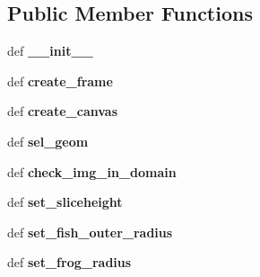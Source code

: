 \subsection*{Public Member Functions}
\begin{DoxyCompactItemize}
\item 
\hypertarget{classpyfrp__subwin_1_1geometry__dialog_a8d39e5a018a156eb1c1b6e3bfdfa5295}{def {\bfseries \+\_\+\+\_\+init\+\_\+\+\_\+}}\label{classpyfrp__subwin_1_1geometry__dialog_a8d39e5a018a156eb1c1b6e3bfdfa5295}

\item 
\hypertarget{classpyfrp__subwin_1_1geometry__dialog_a41cfb95e4241f7089dda03d9921329a9}{def {\bfseries create\+\_\+frame}}\label{classpyfrp__subwin_1_1geometry__dialog_a41cfb95e4241f7089dda03d9921329a9}

\item 
\hypertarget{classpyfrp__subwin_1_1geometry__dialog_a7d8fc02027fd8a693b1b96ee85cd4e53}{def {\bfseries create\+\_\+canvas}}\label{classpyfrp__subwin_1_1geometry__dialog_a7d8fc02027fd8a693b1b96ee85cd4e53}

\item 
\hypertarget{classpyfrp__subwin_1_1geometry__dialog_a25b8f2ca40a58fabf33653dd5ed667d5}{def {\bfseries sel\+\_\+geom}}\label{classpyfrp__subwin_1_1geometry__dialog_a25b8f2ca40a58fabf33653dd5ed667d5}

\item 
\hypertarget{classpyfrp__subwin_1_1geometry__dialog_a4313586cc51acb23523ca2a7493d5797}{def {\bfseries check\+\_\+img\+\_\+in\+\_\+domain}}\label{classpyfrp__subwin_1_1geometry__dialog_a4313586cc51acb23523ca2a7493d5797}

\item 
\hypertarget{classpyfrp__subwin_1_1geometry__dialog_a512d9462da92bae0f5b6246576ca5a5d}{def {\bfseries set\+\_\+sliceheight}}\label{classpyfrp__subwin_1_1geometry__dialog_a512d9462da92bae0f5b6246576ca5a5d}

\item 
\hypertarget{classpyfrp__subwin_1_1geometry__dialog_ab6a42708c12a1a1e21a1dab0e9c8616f}{def {\bfseries set\+\_\+fish\+\_\+outer\+\_\+radius}}\label{classpyfrp__subwin_1_1geometry__dialog_ab6a42708c12a1a1e21a1dab0e9c8616f}

\item 
\hypertarget{classpyfrp__subwin_1_1geometry__dialog_a4d9c6b61be206625502619e129c61362}{def {\bfseries set\+\_\+frog\+\_\+radius}}\label{classpyfrp__subwin_1_1geometry__dialog_a4d9c6b61be206625502619e129c61362}


\end{DoxyCompactItemize}

